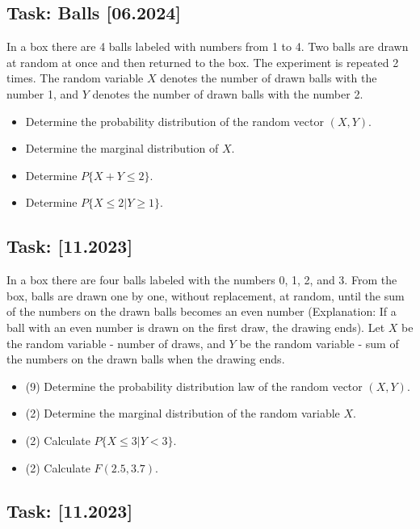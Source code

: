 \documentclass[a4paper, 12pt]{article}
\begin{document}
\subsection*{Task: Balls [06.2024]}

In a box there are 4 balls labeled with numbers from 1 to 4. Two balls are drawn at random at once and then returned to the box. The experiment is repeated 2 times. The random variable $X$ denotes the number of drawn balls with the number 1, and $Y$ denotes the number of drawn balls with the number 2.

\begin{itemize}
 \item   [A)] Determine the probability distribution of the random vector $(X, Y)$.
\item [B)] Determine the marginal distribution of $X$.
\item [C)] Determine $P\{X + Y \leq 2\}$.
\item [D)] Determine $P\{X \leq 2 | Y \geq 1\}$.
\end{itemize}


\subsection*{Task: [11.2023]}

In a box there are four balls labeled with the numbers 0, 1, 2, and 3. From the box, balls are drawn one by one, without replacement, at random, until the sum of the numbers on the drawn balls becomes an even number (Explanation: If a ball with an even number is drawn on the first draw, the drawing ends). Let $X$ be the random variable - number of draws, and $Y$ be the random variable - sum of the numbers on the drawn balls when the drawing ends.

\begin{itemize}
    \item [a)] (9) Determine the probability distribution law of the random vector $(X, Y)$.
    \item [b)] (2) Determine the marginal distribution of the random variable $X$.
    \item [c)] (2) Calculate $P\{X \leq 3 | Y < 3\}$.
    \item [d)] (2) Calculate $F(2.5, 3.7)$.
\end{itemize}

\subsection*{Task: [11.2023]}
\end{document}
